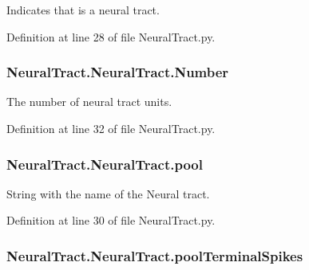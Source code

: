 Indicates that is a neural tract. 



Definition at line 28 of file Neural\+Tract.\+py.

\subsubsection[{\texorpdfstring{Number}{Number}}]{\setlength{\rightskip}{0pt plus 5cm}Neural\+Tract.\+Neural\+Tract.\+Number}\hypertarget{class_neural_tract_1_1_neural_tract_a9cf4c6df3fb8818e955817bb3ea9ffc4}{}\label{class_neural_tract_1_1_neural_tract_a9cf4c6df3fb8818e955817bb3ea9ffc4}


The number of neural tract units. 



Definition at line 32 of file Neural\+Tract.\+py.

\subsubsection[{\texorpdfstring{pool}{pool}}]{\setlength{\rightskip}{0pt plus 5cm}Neural\+Tract.\+Neural\+Tract.\+pool}\hypertarget{class_neural_tract_1_1_neural_tract_af0d232b9b86f3bae802b32777d0405d0}{}\label{class_neural_tract_1_1_neural_tract_af0d232b9b86f3bae802b32777d0405d0}


String with the name of the Neural tract. 



Definition at line 30 of file Neural\+Tract.\+py.

\subsubsection[{\texorpdfstring{pool\+Terminal\+Spikes}{poolTerminalSpikes}}]{\setlength{\rightskip}{0pt plus 5cm}Neural\+Tract.\+Neural\+Tract.\+pool\+Terminal\+Spikes}\hypertarget{class_neural_tract_1_1_neural_tract_a1d104906ff30028e44e377a9e1ed5a3d}{}\label{class_neural_tract_1_1_neural_tract_a1d104906ff30028e44e377a9e1ed5a3d}



